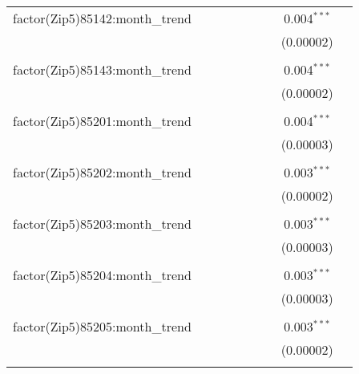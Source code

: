 \begin{table}[H]
{\begin{tabular}{@{\extracolsep{5pt}}lcccccccc}
  factor(Zip5)85142:month\_trend &  &  &  &  &  &  & 0.004$^{***}$ &  \\  

   &  &  &  &  &  &  & (0.00002) &  \\  

   & & & & & & & & \\  

  factor(Zip5)85143:month\_trend &  &  &  &  &  &  & 0.004$^{***}$ &  \\  

   &  &  &  &  &  &  & (0.00002) &  \\  

   & & & & & & & & \\  

  factor(Zip5)85201:month\_trend &  &  &  &  &  &  & 0.004$^{***}$ &  \\  

   &  &  &  &  &  &  & (0.00003) &  \\  

   & & & & & & & & \\  

  factor(Zip5)85202:month\_trend &  &  &  &  &  &  & 0.003$^{***}$ &  \\  

   &  &  &  &  &  &  & (0.00002) &  \\  

   & & & & & & & & \\  

  factor(Zip5)85203:month\_trend &  &  &  &  &  &  & 0.003$^{***}$ &  \\  

   &  &  &  &  &  &  & (0.00003) &  \\  

   & & & & & & & & \\  

  factor(Zip5)85204:month\_trend &  &  &  &  &  &  & 0.003$^{***}$ &  \\  

   &  &  &  &  &  &  & (0.00003) &  \\  

   & & & & & & & & \\  

  factor(Zip5)85205:month\_trend &  &  &  &  &  &  & 0.003$^{***}$ &  \\  

   &  &  &  &  &  &  & (0.00002) &  \\  

   & & & & & & & & \\  


\end{tabular}}
\end{table}
